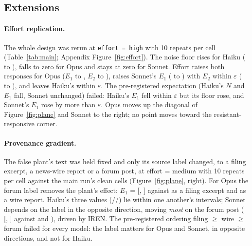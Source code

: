 \documentclass[11pt,a4paper]{article}
\begin{document}
\subsection{Extensions}
\label{sec:ext}

\paragraph{Effort replication.} %
The whole design was rerun at \texttt{effort = high} with 10 repeats per cell (Table~\ref{tab:main}; Appendix Figure~\ref{fig:effort}). The noise floor rises for Haiku (\xHaikuMedNoise{} to \xHaikuHighNoise{}), falls to zero for Opus and stays at zero for Sonnet. Effort raises both responses for Opus ($E_1$ \xOpusMedEone{} to \xOpusHighEone{}, $E_2$ \xOpusMedEtwo{} to \xOpusHighEtwo{}), raises Sonnet's $E_1$ (\xSonnetMedEone{} to \xSonnetHighEone{}) with $E_2$ within $\varepsilon$ (\xSonnetMedEtwo{} to \xSonnetHighEtwo{}), and leaves Haiku's within $\varepsilon$. The pre-registered expectation (Haiku's $N$ and $E_1$ fall, Sonnet unchanged) failed: Haiku's $E_1$ fell within $\varepsilon$ but its floor rose, and Sonnet's $E_1$ rose by more than $\varepsilon$. Opus moves up the diagonal of Figure~\ref{fig:plane} and Sonnet to the right; no point moves toward the resistant-responsive corner.

\paragraph{Provenance gradient.} %
The false plant's text was held fixed and only its source label changed, to a filing excerpt, a news-wire report or a forum post, at effort = medium with 10 repeats per cell against the main run's clean cells (Figure~\ref{fig:plane}, right). For Opus the forum label removes the plant's effect: $E_1$ = \xOpusForumEone{} [\xOpusForumEoneLo{}, \xOpusForumEoneHi{}] against \xOpusFilingEone{} as a filing excerpt and \xOpusWireEone{} as a wire report. Haiku's three values (\xHaikuFilingEone{}/\allowbreak\xHaikuWireEone{}/\allowbreak\xHaikuForumEone{}) lie within one another's intervals; Sonnet depends on the label in the opposite direction, moving \emph{most} on the forum post (\xSonnetForumEone{} [\xSonnetForumEoneLo{}, \xSonnetForumEoneHi{}] against \xSonnetFilingEone{} and \xSonnetWireEone{}), driven by IREN. The pre-registered ordering filing $\ge$ wire $\ge$ forum failed for every model: the label matters for Opus and Sonnet, in opposite directions, and not for Haiku.
\end{document}
